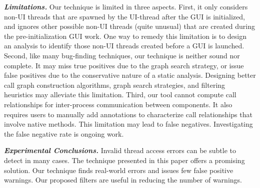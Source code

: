 \vspace{1mm}

\noindent \textbf{\textit{Limitations.}}
Our technique is limited in three aspects. First, it only considers
non-UI threads that are spawned by the UI-thread after the GUI
is initialized, and ignores other possible non-UI threads (quite unusual)
that are created during the pre-initialization GUI work. One way
to remedy this limitation is to design an analysis to identify
those non-UI threads created before a GUI is launched.
Second, like many bug-finding techniques, our technique
is neither sound nor complete. It may miss true positives due
to the graph search strategy, or
issue false positives due to the conservative nature of
a static analysis. Designing better call graph construction algorithms,
graph search strategies, and filtering heuristics may alleviate this limitation.
Third, our tool cannot compute call relationships
for inter-process communication between components. It also
requires users to manually add annotations to characterize
call relationships that involve native methods. This limitation
may lead to false negatives. Investigating the false negative
rate is ongoing work.


\vspace{1mm}

\noindent \textbf{\textit{Experimental Conclusions.}}
Invalid thread access errors  can be subtle to detect in many cases.
The technique presented in this paper offers a promising solution.
Our technique finds real-world errors and issues
few false positive warnings. Our
proposed filters are useful in reducing the number of warnings.

